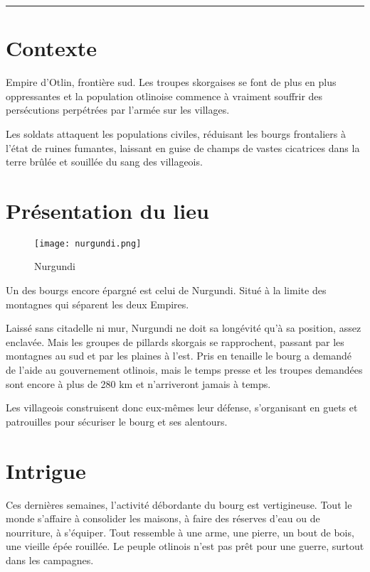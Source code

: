\documentclass[french, a4paper, 12pt]{article}
\begin{document}
 \maketitle \vspace{3pt} \hrule \vspace{3pt}

\tableofcontents



\section{Contexte}

Empire d'Otlin, frontière sud. Les troupes skorgaises se font de plus en plus oppressantes et la population otlinoise commence à vraiment souffrir des persécutions perpétrées par l'armée sur les villages.

Les soldats attaquent les populations civiles, réduisant les bourgs frontaliers à l'état de ruines fumantes, laissant en guise de champs de vastes cicatrices dans la terre brûlée et souillée du sang des villageois.

\section{Présentation du lieu}

\begin{figure}[htp]
\centering
\texttt{[image: nurgundi.png]}
\caption{Nurgundi}
\end{figure}

Un des bourgs encore épargné est celui de Nurgundi. Situé à la limite des montagnes qui séparent les deux Empires.

Laissé sans citadelle ni mur, Nurgundi ne doit sa longévité qu'à sa position, assez enclavée. Mais les groupes de pillards skorgais se rapprochent, passant par les montagnes au sud et par les plaines à l'est. Pris en tenaille le bourg a demandé de l'aide au gouvernement otlinois, mais le temps presse et les troupes demandées sont encore à plus de 280 km et n'arriveront jamais à temps.

Les villageois construisent donc eux-mêmes leur défense, s'organisant en guets et patrouilles pour sécuriser le bourg et ses alentours.

\section{Intrigue}

Ces dernières semaines, l'activité débordante du bourg est vertigineuse. Tout le monde s'affaire à consolider les maisons, à faire des réserves d'eau ou de nourriture, à s'équiper. Tout ressemble à une arme, une pierre, un bout de bois, une vieille épée rouillée. Le peuple otlinois n'est pas prêt pour une guerre, surtout dans les campagnes.
\end{document}
